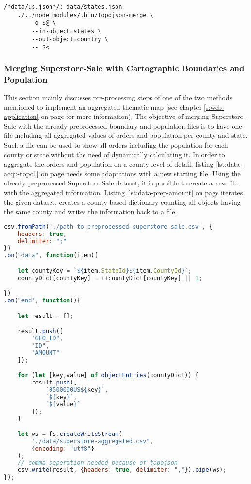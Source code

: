 \begin{lstlisting}[style={makefile}, caption={Make task for converting state boundaries to a county boundary}, label={lst:data-acqu-topo3}]
/*data/us.json*/: data/states.json
    ./../node_modules/.bin/topojson-merge \
        -o $@ \
        --in-object=states \
        --out-object=country \
        -- $<
\end{lstlisting}

\subsubsection{Merging Superstore-Sale with Cartographic Boundaries and Population}
This section mainly discusses pre-processing steps of one of the two methods mentioned to implement an aggregated thematic map (see chapter \ref{s:web-application} on page \pageref{s:web-application} for more information). The objective of merging Superstore-Sale with the already preprocessed boundary and population files is to have one file including all aggregated values of orders and population per county and state. Such a file can be used to show all orders including the population for each county or state without the need of dynamically calculating it.
In order to aggregate the orders and population on a county level of detail, listing \ref{lst:data-acqu-topo1} on page \pageref{lst:data-acqu-topo1} needs some adaptations with a new starting file. Using the already preprocessed Superstore-Sale dataset, it is possible to create a new file with the aggregated information. Listing \ref{lst:data-prep-amount} on page \pageref{lst:data-prep-amount} iterates the given dataset, creates a county-based dictionary counting all objects having the same county and writes the information back to a file.

\begin{lstlisting}[language=JavaScript, caption={Creating the file containing aggregation information}, label={lst:data-prep-amount}]
csv.fromPath("./path-to-preprocessed-superstore-sale.csv", {
    headers: true,
    delimiter: ";"
})
.on("data", function(item){

    let countyKey = `${item.StateId}${item.CountyId}`;
    countyDict[countyKey] = ++countyDict[countyKey] || 1;

})
.on("end", function(){

    let result = [];

    result.push([
        "GEO_ID",
        "ID",
        "AMOUNT"
    ]);

    for (let [key,value] of objectEntries(countyDict)) {
        result.push([
            `0500000US${key}`,
            `${key}`,
            `${value}`
        ]);
    }

    let ws = fs.createWriteStream(
        "./data/superstore-aggregated.csv",
        {encoding: "utf8"}
    );
    // comma seperation needed because of topojson
    csv.write(result, {headers: true, delimiter: ","}).pipe(ws);
});
\end{lstlisting}

